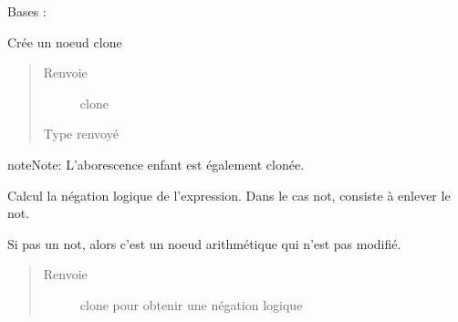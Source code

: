 \documentclass[letterpaper,10pt,french]{sphinxmanual}
\begin{document}
\begin{fulllineitems}
\label{\detokenize{logicexpressionnodes:logicexpressionnodes.LogicExpressionNode}}
Bases : 

\begin{fulllineitems}
\label{\detokenize{logicexpressionnodes:logicexpressionnodes.LogicExpressionNode.clone}}
Crée un noeud clone
\begin{quote}\begin{description}
\item[{Renvoie}] \leavevmode
clone

\item[{Type renvoyé}] \leavevmode
{\hyperref[\detokenize{logicexpressionnodes:logicexpressionnodes.LogicExpressionNode}]{}}

\end{description}\end{quote}

\begin{sphinxadmonition}{note}{Note:}
L’aborescence enfant est également clonée.
\end{sphinxadmonition}

\end{fulllineitems}


\begin{fulllineitems}
\label{\detokenize{logicexpressionnodes:logicexpressionnodes.LogicExpressionNode.logicNegateClone}}
Calcul la négation logique de l’expression.
Dans le cas not, consiste à enlever le not.

Si pas un not, alors c’est un noeud arithmétique qui n’est pas modifié.
\begin{quote}\begin{description}
\item[{Renvoie}] \leavevmode
clone pour obtenir une négation logique


\end{description}
\end{quote}
\end{fulllineitems}
\end{fulllineitems}
\end{document}
